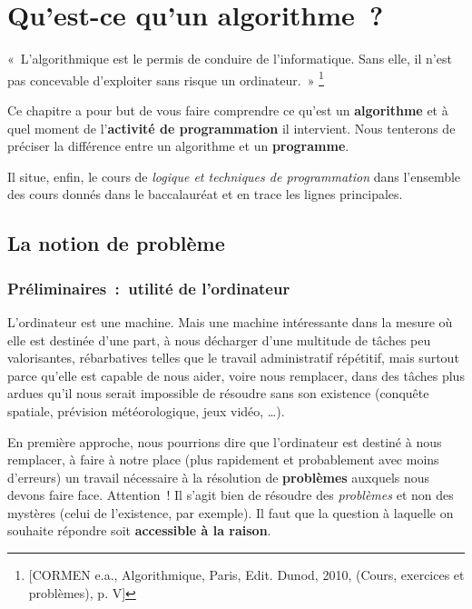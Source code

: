 \chapter{Qu’est-ce qu’un algorithme~?}

\begin{Exergue}
	«~L’algorithmique est le permis de conduire de l’informatique.
	Sans elle, il n’est pas concevable d’exploiter sans risque un ordinateur.~»
	\footnote{[CORMEN e.a., Algorithmique, Paris, Edit. Dunod, 2010, (Cours, 
	exercices et problèmes), p. V] }
\end{Exergue}

Ce chapitre a pour but de vous faire comprendre ce
qu’est un \textbf{algorithme} et à quel moment de
l’\textbf{activité de programmation} il intervient. 
Nous tenterons de préciser la différence entre un algorithme 
et un \textbf{programme}.

Il situe, enfin, le cours de \textit{logique et techniques de
programmation} dans l’ensemble des cours donnés dans le baccalauréat et
en trace les lignes principales.

\section{La notion de problème}

	\subsection{Préliminaires~:~utilité de l’ordinateur}
	
		L’ordinateur est une machine. Mais une machine intéressante dans la
		mesure où elle est destinée d’une part, à nous décharger d’une
		multitude de tâches peu valorisantes, rébarbatives telles que le
		travail administratif répétitif, mais surtout parce qu’elle est capable
		de nous aider, voire nous remplacer, dans des tâches plus ardues qu’il
		nous serait impossible de résoudre sans son existence (conquête
		spatiale, prévision météorologique, jeux vidéo, \dots).
		
		En première approche, nous pourrions dire que l’ordinateur est destiné à
		nous remplacer, à faire à notre place (plus rapidement et probablement
		avec moins d’erreurs) un travail nécessaire à la résolution de
		\textbf{problèmes} auxquels nous devons faire face. Attention~! Il
		s’agit bien de résoudre des \textit{problèmes} et non des mystères
		(celui de l’existence, par exemple). Il faut que la question à laquelle
		on souhaite répondre soit \textbf{accessible à la raison}.

